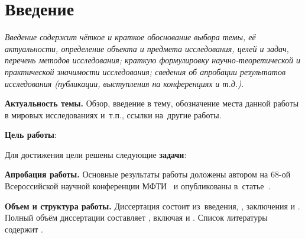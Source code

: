 \chapter*{Введение}                         %

\textit{Введение содержит чёткое и краткое обоснование выбора темы, её актуальности, определение объекта и предмета исследования, целей и задач, перечень методов исследования; краткую формулировку научно-теоретической и практической значимости исследования; сведения об апробации результатов исследования (публикации, выступления на конференциях и т.\:д.).}
\bigskip

\textbf{Актуальность темы.}
Обзор, введение в тему, обозначение места данной работы в мировых исследованиях и~т.\:п., ссылки на~другие работы.

\textbf{Цель работы}:
\aim

Для достижения цели решены следующие \textbf{задачи}:
\tasks

\textbf{Апробация работы.}
Основные результаты работы доложены автором на 68-ой Всероссийской научной конференции МФТИ~\cite{MIPT2026} и опубликованы в~статье~\cite{bib1}.

\textbf{Объем и структура работы.} Диссертация состоит из~введения,
,
заключения и
.
Полный объём диссертации составляет
, включая
 и
.
Список литературы содержит
.